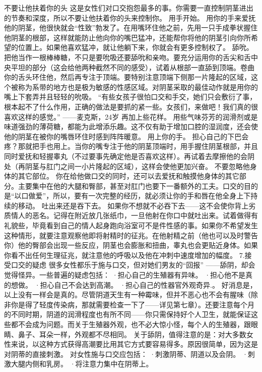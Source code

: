 \documentclass[12pt,UTF8,openany]{ctexbook}
\begin{document}
不要让他扶着你的头
这是女性们对口交抱怨最多的事。你需要一直控制阴茎进出的节奏和深度，所以不要让他扶着你的头来控制你。
用手开始。
用你的手来爱抚他的阴茎，他很快就会“性致”勃发了。在用嘴环住他之前，先用一只手成拳状握住他阴茎的根部，这样就能防止他向你的嘴巴猛冲，还能帮你将他的阴茎引向你所希望的位置上。如果他喜欢猛冲，就让他躺下来，你就会有更多控制权了。
舔吮。
把他当作一根棒棒糖，不只是要吮吸还要舔吮和亲吻。要充分运用你的舌尖和舌中央平坦的部分（这会给他两种截然不同的感受），试着从根部一直舔到顶端。卷曲你的舌头环住他，然后再专注于顶端。要特别注意顶端下侧那一片隆起的区域，这个被称为系带的地方也是极为敏感的性感区域。对阴茎采取的最佳动作就是用你的嘴上下套弄并且轻轻的吮吸。
“有些女孩子很怕口交和手交，她们只会敷衍了事，根本起不了什么作用，正确的做法是要抓的紧一些。女孩们，来做吧！我们真的很喜欢这样的感觉。”
——麦克斯，24岁
再加上些花样。
用些气味芬芳的润滑剂或是味道强劲的薄荷糖，都能为此增添乐趣。这不仅有助于增加口腔的湿润度，还会使他的阴茎在被你的嘴唇环住时感到阵阵暖意。
用上你的手。
担心自己的下巴会疼？那就把手也用上。当你的嘴专注于他的阴茎顶端时，用手握住阴茎根部，并且同时爱抚和轻握睾丸（不过要事先确定他是否喜欢这样）。再试着去摩擦他的会阴处（再阴茎与肛门之间一小片隆起的区域），这样会使他更加兴奋。
不要忽略他身体的其它部位。
你在给他做口交的同时，还可以去爱抚和触摸他身体的其它部分。主要集中在他的大腿和臀部，甚至对肛门也要下一番额外的工夫。口交的目的是“以口做爱”，所以，要有一次完整的经历，就必须让你的手和唇在他全身上下持续的移动。
吐出来还是吞下去。
如果你不想就不必吞下去——这不会使你背上劣质情人的恶名。记得在附近放几张纸巾，一旦他射在你口中就吐出来。试着做得有礼貌些，毕竟看到自己的情人起身跑向浴室可不是件性感的事。如果你不希望发生这种情形，就要注意观察他即将射精时的征兆。在他射精之前（他也可以及时警告你）他的臀部会出现一些反应，阴茎也会膨胀和扭曲，睾丸也会更贴近身体。如果你看不出任何生理征兆，就注意他的呼吸以及他在冲刺中速度增加的幅度。
7.接受口交的疑虑
很多女性都乐于施与口交，但对她们男友的“回报” ——舔阴，却会觉得怪异。一些普遍的疑虑包括：
·担心自己的生殖器有异味。
·担心他不是真的想做。
·担心自己不会达到高潮。
·担心自己的性器官外观奇异.。
好消息是，以上没有一样会是真的。尽管阴道天生有一种霉味，但并不恶心也不会有腥味（除非你是得了轻度传染病，那就需要检查一下了——详见第七章）。还要注意每个月的不同时期，阴道的润滑程度也有所不同——你只需保持好个人卫生，就能保证这些都不会成为问题。而关于生殖器外观，也不必大惊小怪，每个人的生殖器，跟眼睛、鼻子、耳朵一样，外观都不尽相同。
关于舔阴，值得注意的是：对大多数女性来说，以这种方式获得高潮要比用其它方式要容易得多。原因很简单，因为这是对阴蒂的直接刺激。
对女性施与口交应包括：
·刺激阴蒂、阴道以及会阴。
·刺激大腿内侧和乳房。
·将注意力集中在阴蒂上。
\end{document}
